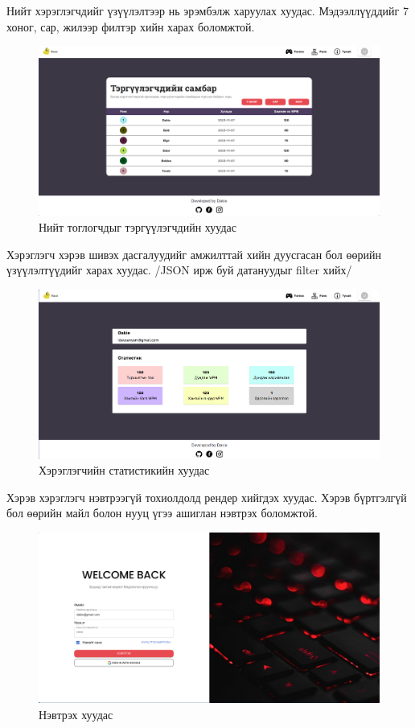 \clearpage
Нийт хэрэглэгчдийг үзүүлэлтээр нь эрэмбэлж харуулах хуудас. Мэдээллүүддийг 7 хоног, сар, жилээр филтэр хийн харах боломжтой.
\begin{figure}[h]
	\centering
	\includegraphics[width=13cm]{images/result/rankpage.png}
	\caption{Нийт тоглогчдыг тэргүүлэгчдийн хуудас}
	\label{fig:results}
\end{figure}

Хэрэглэгч хэрэв шивэх дасгалуудийг амжилттай хийн дуусгасан бол өөрийн үзүүлэлтүүдийг харах хуудас. /JSON ирж буй датануудыг filter хийх/ 
\begin{figure}[h]
	\centering
	\includegraphics[width=13cm]{images/result/statisticspage.png}
	\caption{Хэрэглэгчийн статистикийн хуудас}
	\label{fig:results}
\end{figure}

\clearpage
Хэрэв хэрэглэгч нэвтрээгүй тохиолдолд рендер хийгдэх хуудас. Хэрэв бүртгэлгүй бол өөрийн майл болон нууц үгээ ашиглан нэвтрэх боломжтой.
\begin{figure}[h]
	\centering
	\includegraphics[width=13cm]{images/result/loginpage.png}
	\caption{Нэвтрэх хуудас}
	\label{fig:results}
\end{figure}